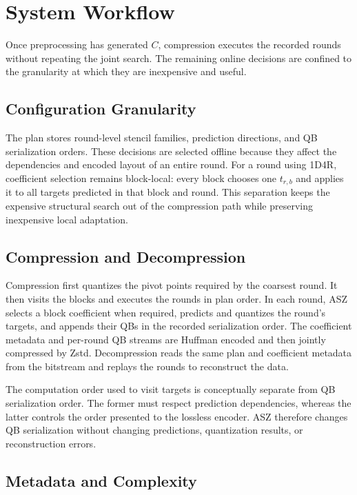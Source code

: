 \section{System Workflow}
\label{sec:asz}

Once preprocessing has generated $C$, compression executes the recorded rounds without repeating the joint search. The remaining online decisions are confined to the granularity at which they are inexpensive and useful.

\subsection{Configuration Granularity}

The plan stores round-level stencil families, prediction directions, and QB serialization orders. These decisions are selected offline because they affect the dependencies and encoded layout of an entire round. For a round using 1D4R, coefficient selection remains block-local: every block chooses one $t_{r,b}$ and applies it to all targets predicted in that block and round. This separation keeps the expensive structural search out of the compression path while preserving inexpensive local adaptation.


\subsection{Compression and Decompression}

Compression first quantizes the pivot points required by the coarsest round. It then visits the blocks and executes the rounds in plan order. In each round, ASZ selects a block coefficient when required, predicts and quantizes the round's targets, and appends their QBs in the recorded serialization order. The coefficient metadata and per-round QB streams are Huffman encoded and then jointly compressed by Zstd. Decompression reads the same plan and coefficient metadata from the bitstream and replays the rounds to reconstruct the data.

The computation order used to visit targets is conceptually separate from QB serialization order. The former must respect prediction dependencies, whereas the latter controls the order presented to the lossless encoder. ASZ therefore changes QB serialization without changing predictions, quantization results, or reconstruction errors.

\subsection{Metadata and Complexity}

